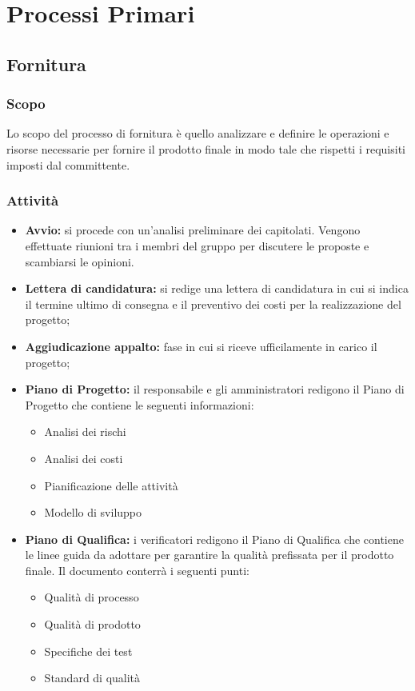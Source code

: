 \section{Processi Primari}
\subsection{Fornitura}
\subsubsection{Scopo}
Lo scopo del processo di fornitura è quello analizzare e definire le operazioni e risorse necessarie per fornire il prodotto finale in modo tale che rispetti i requisiti imposti dal committente.
\subsubsection{Attività}
\begin{itemize}
    \item \textbf{Avvio:} si procede con un'analisi preliminare dei capitolati. Vengono effettuate riunioni tra i membri del gruppo per discutere le proposte e scambiarsi le opinioni.
    \item \textbf{Lettera di candidatura:} si redige una lettera di candidatura in cui si indica il termine ultimo di consegna e il preventivo dei costi per la realizzazione del progetto;
    \item \textbf{Aggiudicazione appalto:} fase in cui si riceve ufficilamente in carico il progetto;
    \item \textbf{Piano di Progetto:} il responsabile e gli amministratori redigono il Piano di Progetto che contiene le seguenti informazioni:
        \begin{itemize}
                \item {Analisi dei rischi}
                \item {Analisi dei costi}
                \item {Pianificazione delle attività}
                \item {Modello di sviluppo}
        \end{itemize}
    \item \textbf{Piano di Qualifica:} i verificatori redigono il Piano di Qualifica che contiene le linee guida da adottare per garantire la qualità prefissata per il prodotto finale. Il documento conterrà i seguenti punti:
        \begin{itemize}
                \item {Qualità di processo}
                \item {Qualità di prodotto}
                \item {Specifiche dei test}
                \item {Standard di qualità}
            \end{itemize}
\end{itemize}
